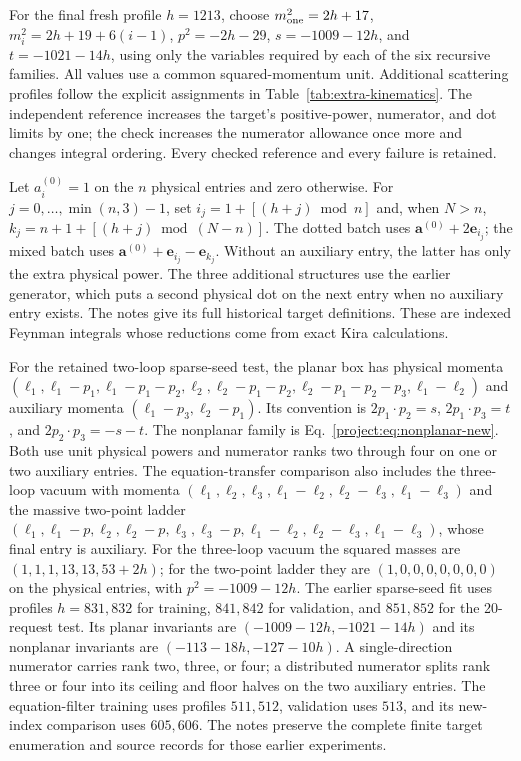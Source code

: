 For the final fresh profile $h=1213$, choose $m_{\rm one}^2=2h+17$, $m_i^2=2h+19+6(i-1)$, $p^2=-2h-29$, $s=-1009-12h$, and $t=-1021-14h$, using only the variables required by each of the six recursive families. All values use a common squared-momentum unit. Additional scattering profiles follow the explicit assignments in Table~\ref{tab:extra-kinematics}. The independent reference increases the target's positive-power, numerator, and dot limits by one; the check increases the numerator allowance once more and changes integral ordering. Every checked reference and every failure is retained.


Let $a_i^{(0)}=1$ on the $n$ physical entries and zero otherwise. For $j=0,\ldots,\min(n,3)-1$, set $i_j=1+[(h+j)\bmod n]$ and, when $N>n$, $k_j=n+1+[(h+j)\bmod(N-n)]$. The dotted batch uses $\boldsymbol a^{(0)}+2\boldsymbol e_{i_j}$; the mixed batch uses $\boldsymbol a^{(0)}+\boldsymbol e_{i_j}-\boldsymbol e_{k_j}$. Without an auxiliary entry, the latter has only the extra physical power. The three additional structures use the earlier generator, which puts a second physical dot on the next entry when no auxiliary entry exists. The notes give its full historical target definitions. These are indexed Feynman integrals whose reductions come from exact Kira calculations.

For the retained two-loop sparse-seed test, the planar box has physical momenta $(\ell_1,\ell_1-p_1,\ell_1-p_1-p_2,\ell_2,\ell_2-p_1-p_2,\ell_2-p_1-p_2-p_3,\ell_1-\ell_2)$ and auxiliary momenta $(\ell_1-p_3,\ell_2-p_1)$. Its convention is $2p_1\cdot p_2=s$, $2p_1\cdot p_3=t$, and $2p_2\cdot p_3=-s-t$. The nonplanar family is Eq.~\eqref{project:eq:nonplanar-new}. Both use unit physical powers and numerator ranks two through four on one or two auxiliary entries. The equation-transfer comparison also includes the three-loop vacuum with momenta $(\ell_1,\ell_2,\ell_3,\ell_1-\ell_2,\ell_2-\ell_3,\ell_1-\ell_3)$ and the massive two-point ladder $(\ell_1,\ell_1-p,\ell_2,\ell_2-p,\ell_3,\ell_3-p,\ell_1-\ell_2,\ell_2-\ell_3,\ell_1-\ell_3)$, whose final entry is auxiliary. For the three-loop vacuum the squared masses are $(1,1,1,13,13,53+2h)$; for the two-point ladder they are $(1,0,0,0,0,0,0,0)$ on the physical entries, with $p^2=-1009-12h$. The earlier sparse-seed fit uses profiles $h=831,832$ for training, $841,842$ for validation, and $851,852$ for the 20-request test. Its planar invariants are $(-1009-12h,-1021-14h)$ and its nonplanar invariants are $(-113-18h,-127-10h)$. A single-direction numerator carries rank two, three, or four; a distributed numerator splits rank three or four into its ceiling and floor halves on the two auxiliary entries. The equation-filter training uses profiles $511,512$, validation uses $513$, and its new-index comparison uses $605,606$. The notes preserve the complete finite target enumeration and source records for those earlier experiments.
